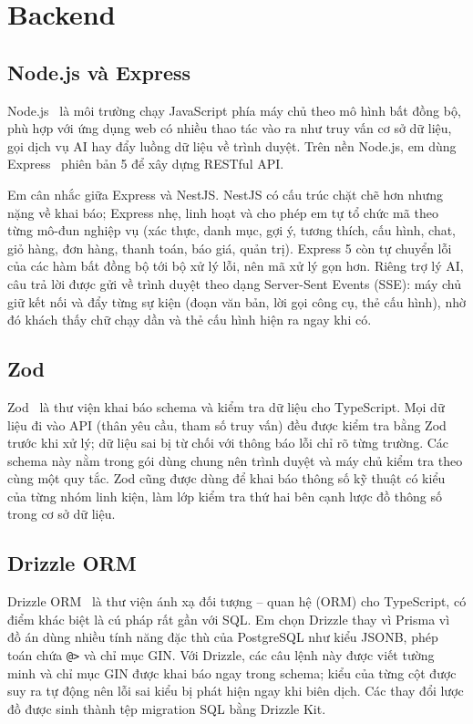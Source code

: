 \section{Backend}

\subsection{Node.js và Express}

Node.js~\cite{nodejs} là môi trường chạy JavaScript phía máy chủ theo mô hình bất đồng bộ, phù hợp với ứng dụng web có nhiều thao tác vào ra như truy vấn cơ sở dữ liệu, gọi dịch vụ AI hay đẩy luồng dữ liệu về trình duyệt. Trên nền Node.js, em dùng Express~\cite{express} phiên bản 5 để xây dựng RESTful API.

Em cân nhắc giữa Express và NestJS. NestJS có cấu trúc chặt chẽ hơn nhưng nặng về khai báo; Express nhẹ, linh hoạt và cho phép em tự tổ chức mã theo từng mô-đun nghiệp vụ (xác thực, danh mục, gợi ý, tương thích, cấu hình, chat, giỏ hàng, đơn hàng, thanh toán, báo giá, quản trị). Express 5 còn tự chuyển lỗi của các hàm bất đồng bộ tới bộ xử lý lỗi, nên mã xử lý gọn hơn. Riêng trợ lý AI, câu trả lời được gửi về trình duyệt theo dạng Server-Sent Events (SSE): máy chủ giữ kết nối và đẩy từng sự kiện (đoạn văn bản, lời gọi công cụ, thẻ cấu hình), nhờ đó khách thấy chữ chạy dần và thẻ cấu hình hiện ra ngay khi có.

\subsection{Zod}

Zod~\cite{zod} là thư viện khai báo schema và kiểm tra dữ liệu cho TypeScript. Mọi dữ liệu đi vào API (thân yêu cầu, tham số truy vấn) đều được kiểm tra bằng Zod trước khi xử lý; dữ liệu sai bị từ chối với thông báo lỗi chỉ rõ từng trường. Các schema này nằm trong gói dùng chung nên trình duyệt và máy chủ kiểm tra theo cùng một quy tắc. Zod cũng được dùng để khai báo thông số kỹ thuật có kiểu của từng nhóm linh kiện, làm lớp kiểm tra thứ hai bên cạnh lược đồ thông số trong cơ sở dữ liệu.

\subsection{Drizzle ORM}

Drizzle ORM~\cite{drizzle} là thư viện ánh xạ đối tượng -- quan hệ (ORM) cho TypeScript, có điểm khác biệt là cú pháp rất gần với SQL. Em chọn Drizzle thay vì Prisma vì đồ án dùng nhiều tính năng đặc thù của PostgreSQL như kiểu JSONB, phép toán chứa \texttt{@>} và chỉ mục GIN. Với Drizzle, các câu lệnh này được viết tường minh và chỉ mục GIN được khai báo ngay trong schema; kiểu của từng cột được suy ra tự động nên lỗi sai kiểu bị phát hiện ngay khi biên dịch. Các thay đổi lược đồ được sinh thành tệp migration SQL bằng Drizzle Kit.

